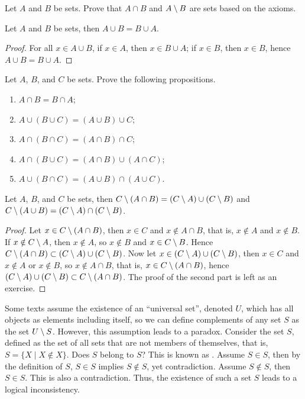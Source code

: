 \documentclass[10pt]{article}
\begin{document}
\begin{problem}
    Let $A$ and $B$ be sets. Prove that $A\cap B$ and $A\setminus B$ are sets based on the axioms.
\end{problem}
\begin{proposition}
    Let $A$ and $B$ be sets, then $A\cup B=B\cup A$.
\end{proposition}
\begin{proof}
    For all $x\in A\cup B$, if $x\in A$, then $x\in B\cup A$; if $x\in B$, then $x\in B$, hence $A\cup B=B\cup A$.
\end{proof}
\begin{problem}
    Let $A$, $B$, and $C$ be sets. Prove the following propositions.
    \begin{enumerate}
        \item $A\cap B=B\cap A$;
        \item $A\cup(B\cup C)=(A\cup B)\cup C$;
        \item $A\cap(B\cap C)=(A\cap B)\cap C$;
        \item $A\cap(B\cup C)=(A\cap B)\cup(A\cap C)$;
        \item $A\cup(B\cap C)=(A\cup B)\cap(A\cup C)$.
    \end{enumerate}
\end{problem}
\begin{theorem}
    Let $A$, $B$, and $C$ be sets, then $C\setminus(A\cap B)=(C\setminus A)\cup(C\setminus B)$ and $C\setminus(A\cup B)=(C\setminus A)\cap(C\setminus B)$.
\end{theorem}
\begin{proof}
    Let $x\in C\setminus(A\cap B)$, then $x\in C$ and $x\notin A\cap B$, that is, $x\notin A$ and $x\notin B$. If $x\notin C\setminus A$, then $x\notin A$, so $x\notin B$ and $x\in C\setminus B$. Hence $C\setminus(A\cap B)\subset(C\setminus A)\cup(C\setminus B)$. Now let $x\in(C\setminus A)\cup(C\setminus B)$, then $x\in C$ and $x\notin A$ or $x\notin B$, so $x\notin A\cap B$, that is, $x\in C\setminus(A\cap B)$, hence $(C\setminus A)\cup(C\setminus B)\subset C\setminus(A\cap B)$. The proof of the second part is left as an exercise.
\end{proof}
\par
Some texts assume the existence of an ``universal set'', denoted $U$, which has all objects as elements including itself, so we can define complements of any set $S$ as the set $U\setminus S$. However, this assumption leads to a paradox. Consider the set $S$, defined as the set of all sets that are not members of themselves, that is, $S=\{X\mid X\notin X\}$. Does $S$ belong to $S$? This is known as . Assume $S\in S$, then by the definition of $S$, $S\in S$ implies $S\notin S$, yet contradiction. Assume $S\notin S$, then $S\in S$. This is also a contradiction. Thus, the existence of such a set $S$ leads to a logical inconsistency.
\end{document}
